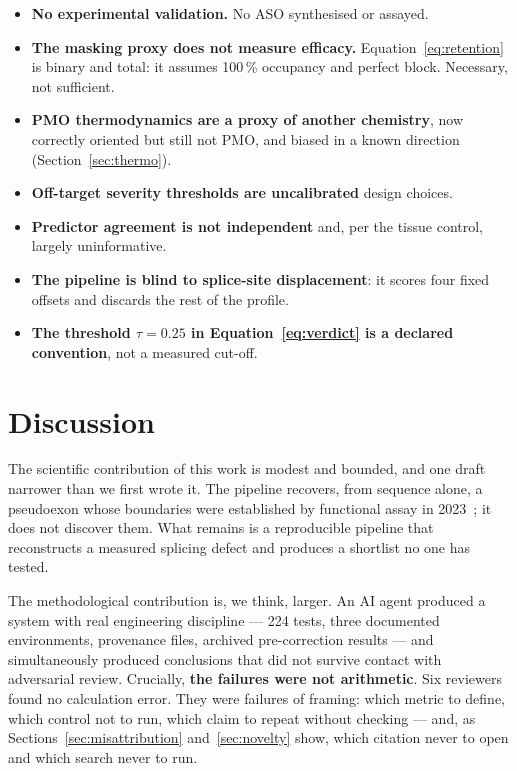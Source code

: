 \documentclass[11pt,a4paper]{article}
\begin{document}
\begin{itemize}[nosep, leftmargin=1.4em]
  \item \textbf{No experimental validation.} No ASO synthesised or assayed.
  \item \textbf{The masking proxy does not measure efficacy.} Equation~\ref{eq:retention} is binary
        and total: it assumes 100\,\% occupancy and perfect block. Necessary, not sufficient.
  \item \textbf{PMO thermodynamics are a proxy of another chemistry}, now correctly oriented but
        still not PMO, and biased in a known direction (Section~\ref{sec:thermo}).
  \item \textbf{Off-target severity thresholds are uncalibrated} design choices.
  \item \textbf{Predictor agreement is not independent} and, per the tissue control, largely
        uninformative.
  \item \textbf{The pipeline is blind to splice-site displacement}: it scores four fixed offsets
        and discards the rest of the profile.
  \item \textbf{The threshold $\tau = 0.25$ in Equation~\ref{eq:verdict} is a declared convention},
        not a measured cut-off.
\end{itemize}

\section{Discussion}

The scientific contribution of this work is modest and bounded, and one draft narrower than we
first wrote it. The pipeline recovers, from sequence alone, a pseudoexon whose boundaries were
established by functional assay in 2023~\cite{corradi2023}; it does not discover them. What remains
is a reproducible pipeline that reconstructs a measured splicing defect and produces a shortlist no
one has tested.

The methodological contribution is, we think, larger. An AI agent produced a system with real
engineering discipline --- 224 tests, three documented environments, provenance files, archived
pre-correction results --- and simultaneously produced conclusions that did not survive contact with
adversarial review. Crucially, \textbf{the failures were not arithmetic}. Six reviewers found no
calculation error. They were failures of framing: which metric to define, which control not to run,
which claim to repeat without checking --- and, as Sections~\ref{sec:misattribution}
and~\ref{sec:novelty} show, which citation never to open and which search never to run.
\end{document}
